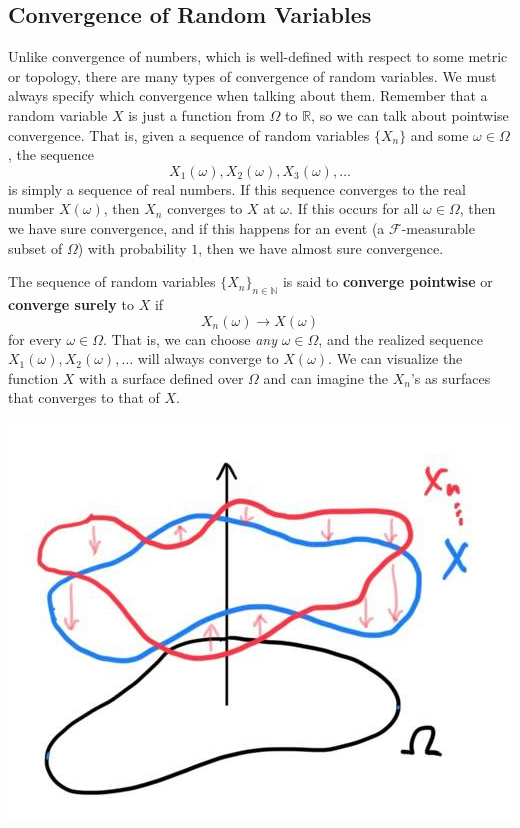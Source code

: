 \subsection{Convergence of Random Variables}

  Unlike convergence of numbers, which is well-defined with respect to some metric or topology, there are many types of convergence of random variables. We must always specify which convergence when talking about them. Remember that a random variable $X$ is just a function from $\Omega$ to $\mathbb{R}$, so we can talk about pointwise convergence. That is, given a sequence of random variables $\{X_n\}$ and some $\omega \in \Omega$, the sequence 
  \begin{equation}
    X_1(\omega), X_2 (\omega), X_3(\omega), \ldots
  \end{equation}
  is simply a sequence of real numbers. If this sequence converges to the real number $X(\omega)$, then $X_n$ converges to $X$ at $\omega$. If this occurs for all $\omega \in \Omega$, then we have sure convergence, and if this happens for an event (a $\mathcal{F}$-measurable subset of $\Omega$) with probability $1$, then we have almost sure convergence. 

  \begin{definition}
    The sequence of random variables $\{ X_n\}_{n \in \mathbb{N}}$ is said to \textbf{converge pointwise} or \textbf{converge surely} to $X$ if 
    \begin{equation}
      X_n (\omega) \rightarrow X (\omega)
    \end{equation}
    for every $\omega \in \Omega$. That is, we can choose \textit{any} $\omega \in \Omega$, and the realized sequence $X_1 (\omega), X_2 (\omega), \ldots$ will always converge to $X(\omega)$. We can visualize the function $X$ with a surface defined over $\Omega$ and can imagine the $X_n$'s as surfaces that converges to that of $X$. 
    \begin{center}
      \includegraphics[scale=0.3]{img/sure_convergence.jpg}
    \end{center}
  \end{definition}

